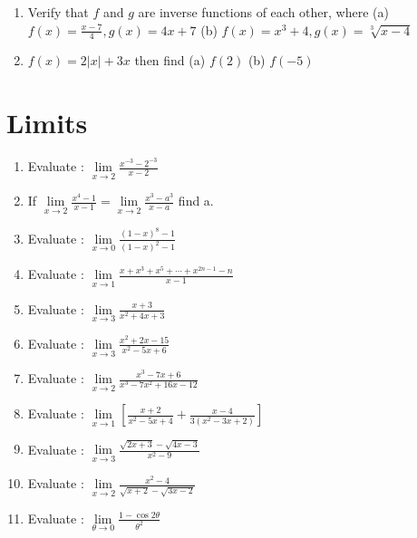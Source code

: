 \documentclass[17pt]{extarticle}
\begin{document}
\begin{multicols}{2}
\begin{enumerate}
\item Verify that $ f $  and  $ g $ are inverse functions of each other, where (a) $ f(x) = \frac { x - 7 }{4}, g(x) = 4x + 7 $ (b) $ f(x) = x^3 + 4, g(x) = \sqrt[3]{x - 4 } $

\item $ f(x) = 2 \left| x \right| + 3x $ then find (a) $ f(2)$ (b) $ f(-5) $

\end{enumerate} 

\section{Limits}
\noindent
\begin{enumerate}
 \item Evaluate : $ \lim\limits_{x \to 2} \frac{ x^{-3} - 2^{-3}}{x-2} $
 
\item If $ \lim\limits_{x \to 2} \frac{ x^4 - 1}{ x - 1} = \lim\limits_{x \to 2} \frac{ x^3 - a^3}{x-a} $ find a.

\item Evaluate : $ \lim\limits_{x \to 0} \frac{ (1- x)^8 - 1}{(1- x)^2 - 1} $ 

 \item Evaluate : $ \lim\limits_{ x \to 1 } \frac{ x + x^3 + x^5 +\cdots +x^{2n - 1} - n }{x-1} $
 
 \item Evaluate : $ \lim\limits_{x \to 3} \frac{ x + 3}{ x^2 +4x + 3 } $
 
\item Evaluate : $ \lim\limits_{x \to 3} \frac{ x^2 + 2x - 15}{ x^2 - 5x + 6 } $

\item Evaluate : $ \lim\limits_{x \to 2} \frac{ x^3 - 7x + 6}{ x^3 - 7x^2 + 16x - 12   } $

\item Evaluate : $ \lim\limits_{ x \to 1 } \left[ \frac{ x + 2 }{x^2-5x + 4} + \frac{ x - 4 }{3(x^2-3x+2)} \right] $

\item Evaluate : $ \lim\limits_{x \to 3} \frac{ \sqrt{ 2x + 3 } - \sqrt{ 4x - 3 } }{ x^2 - 9 } $

\item Evaluate : $ \lim\limits_{x \to 2} \frac{ x^2 - 4 }{ \sqrt{ x + 2 } - \sqrt{ 3x - 2 }  } $

 \item Evaluate : $ \lim\limits_{ \theta \to 0} \frac{ 1 -  \cos 2\theta }{ \theta ^2  } $
 

\end{enumerate}
\end{multicols}
\end{document}
